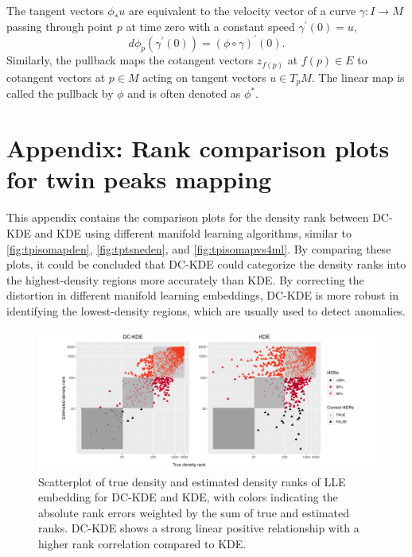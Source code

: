 \documentclass[11pt,a4paper,]{article}
\begin{document}
The tangent vectors \(\phi_*u\) are equivalent to the velocity vector of a curve \(\gamma: I\rightarrow M\) passing through point \(p\) at time zero with a constant speed \(\gamma^{\prime}(0)=u\),
\[
d\phi_p(\gamma^{\prime}(0)) = (\phi \circ \gamma)^\prime (0).
\]
Similarly, the pullback maps the cotangent vectors \(z_{f(p)}\) at \(f(p) \in E\) to cotangent vectors at \(p \in M\) acting on tangent vectors \(u \in T_pM\). The linear map is called the pullback by \(\phi\) and is often denoted as \(\phi^*\).

\hypertarget{twinpeaksappe}{%
\section{Appendix: Rank comparison plots for twin peaks mapping}\label{twinpeaksappe}}

This appendix contains the comparison plots for the density rank between DC-KDE and KDE using different manifold learning algorithms, similar to \autoref{fig:tpisomapden}, \autoref{fig:tptsneden}, and \autoref{fig:tpisomapvs4ml}. By comparing these plots, it could be concluded that DC-KDE could categorize the density ranks into the highest-density regions more accurately than KDE. By correcting the distortion in different manifold learning embeddings, DC-KDE is more robust in identifying the lowest-density regions, which are usually used to detect anomalies.

\begin{figure}

{\centering \includegraphics[width=1\linewidth]{figures/Twin Peak2000_densityrank_comparison_lle_radius8_r0_5_logrank_rec_colprob_smallblocks3_crossfalse} 

}

\caption{Scatterplot of true density and estimated density ranks of LLE embedding for DC-KDE and KDE, with colors indicating the absolute rank errors weighted by the sum of true and estimated ranks. DC-KDE shows a strong linear positive relationship with a higher rank correlation compared to KDE.}\label{fig:tplleden}
\end{figure}
\end{document}
